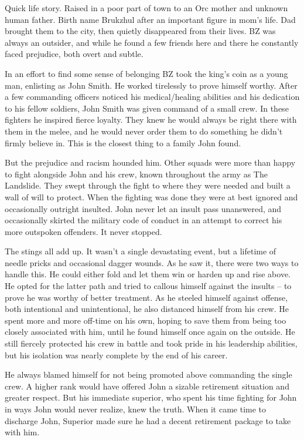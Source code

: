 \hrulefill

Quick life story.
Raised in a poor part of town to an Orc mother and unknown human father.
Birth name Brukzhul after an important figure in mom's life.
Dad brought them to the city, then quietly disappeared from their lives.
BZ was always an outsider, and while he found a few friends here and there he constantly faced prejudice, both overt and subtle.

In an effort to find some sense of belonging BZ took the king's coin as a young man, enlisting as John Smith.
He worked tirelessly to prove himself worthy.
After a few commanding officers noticed his medical/healing abilities and his dedication to his fellow soldiers, John Smith was given command of a small crew.
In these fighters he inspired fierce loyalty.
They knew he would always be right there with them in the melee, and he would never order them to do something he didn't firmly believe in.
This is the closest thing to a family John found.

But the prejudice and racism hounded him.
Other squads were more than happy to fight alongside John and his crew, known throughout the army as The Landslide.
They swept through the fight to where they were needed and built a wall of will to protect.
When the fighting was done they were at best ignored and occasionally outright insulted.
John never let an insult pass unanswered, and occasionally skirted the military code of conduct in an attempt to correct his more outspoken offenders.
It never stopped.

The stings all add up.
It wasn't a single devastating event, but a lifetime of needle pricks and occasional dagger wounds.
As he saw it, there were two ways to handle this.
He could either fold and let them win or harden up and rise above.
He opted for the latter path and tried to callous himself against the insults -- to prove he was worthy of better treatment.
As he steeled himself against offense, both intentional and unintentional, he also distanced himself from his crew.
He spent more and more off-time on his own, hoping to save them from being too closely associated with him, until he found himself once again on the outside.
He still fiercely protected his crew in battle and took pride in his leadership abilities, but his isolation was nearly complete by the end of his career.

He always blamed himself for not being promoted above commanding the single crew.
A higher rank would have offered John a sizable retirement situation and greater respect.
But his immediate superior, who spent his time fighting for John in ways John would never realize, knew the truth.
When it came time to discharge John, Superior made sure he had a decent retirement package to take with him.

